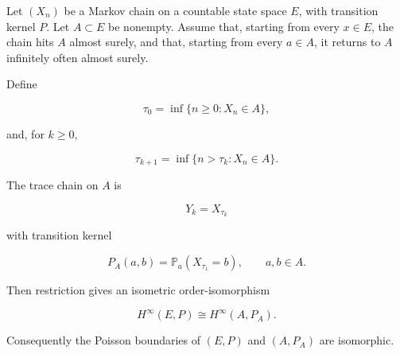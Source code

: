 \documentclass[11pt,a4paper]{scrartcl}
\begin{document}
\begin{lemma}\label{lem:trace-recurrent-subset}
Let \((X_n)\) be a Markov chain on a countable state space
\(E\), with transition kernel \(P\). Let \(A\subset E\) be nonempty. Assume
that, starting from every \(x\in E\), the chain hits \(A\) almost surely, and
that, starting from every \(a\in A\), it returns to \(A\) infinitely often
almost surely.

Define

\[
\tau_0=\inf\{n\ge 0:X_n\in A\},
\]

and, for \(k\ge 0\),

\[
\tau_{k+1}=\inf\{n>\tau_k:X_n\in A\}.
\]

The trace chain on \(A\) is

\[
Y_k=X_{\tau_k}
\]

with transition kernel

\[
P_A(a,b)=\mathbb P_a(X_{\tau_1}=b),
\qquad a,b\in A .
\]

Then restriction gives an isometric order-isomorphism

\[
H^\infty(E,P)\cong H^\infty(A,P_A).
\]

Consequently the Poisson boundaries of \((E,P)\) and \((A,P_A)\) are
isomorphic.

\end{lemma}
\end{document}
